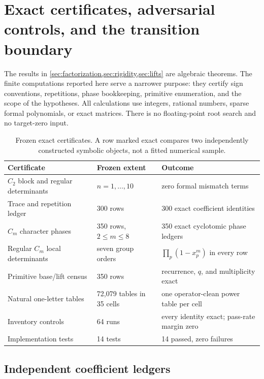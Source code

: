 \section{Exact certificates, adversarial controls, and the transition boundary}
\label{sec:certificates}

The results in \cref{sec:factorization,sec:rigidity,sec:lifts} are algebraic
theorems.  The finite computations reported here serve a narrower purpose:
they certify sign conventions, repetitions, phase bookkeeping, primitive
enumeration, and the scope of the hypotheses.  All calculations use integers,
rational numbers, sparse formal polynomials, or exact matrices.  There is no
floating-point root search and no target-zero input.

\begin{table}[t]
\centering
\caption{Frozen exact certificates.  A row marked exact compares two
independently constructed symbolic objects, not a fitted numerical sample.}
\label{tab:certificates}
\begin{tabularx}{\textwidth}{L{0.27\textwidth}L{0.22\textwidth}X}
\toprule
Certificate & Frozen extent & Outcome \\
\midrule
\(C_2\) block and regular determinants
& \(n=1,\ldots,10\)
& zero formal mismatch terms \\
Trace and repetition ledger
& 300 rows
& 300 exact coefficient identities \\
\(C_m\) character phases
& 350 rows, \(2\le m\le8\)
& 350 exact cyclotomic phase ledgers \\
Regular \(C_m\) local determinants
& seven group orders
& \(\prod_p(1-x_p^m)\) in every row \\
Primitive base/lift census
& 350 rows
& recurrence, \(q\), and multiplicity exact \\
Natural one-letter tables
& 72,079 tables in 35 cells
& one operator-clean power table per cell \\
Inventory controls
& 64 runs
& every identity exact; pass-rate margin zero \\
Implementation tests
& 14 tests
& 14 passed, zero failures \\
\bottomrule
\end{tabularx}
\end{table}

\subsection{Independent coefficient ledgers}

